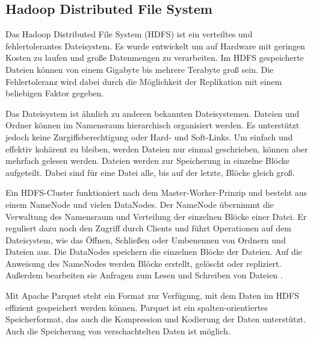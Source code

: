 \subsection{Hadoop Distributed File System}

Das Hadoop Distributed File System (HDFS) ist ein verteiltes und fehlertolerantes Dateisystem.
Es wurde entwickelt um auf Hardware mit geringen Kosten zu laufen und große Datenmengen zu verarbeiten.
Im HDFS gespeicherte Dateien können von einem Gigabyte bis mehrere Terabyte groß sein.
Die Fehlertoleranz wird dabei durch die Möglichkeit der Replikation mit einem beliebigen Faktor gegeben.

Das Dateisystem ist ähnlich zu anderen bekannten Dateisystemen.
Dateien und Ordner können im Namensraum hierarchisch organisiert werden.
Es unterstützt jedoch keine Zurgiffsberechtigung oder Hard- und Soft-Links.
Um einfach und effektiv kohärent zu bleiben, werden Dateien nur einmal geschrieben, können aber mehrfach gelesen werden.
Dateien werden zur Speicherung in einzelne Blöcke aufgeteilt.
Dabei sind für eine Datei alle, bis auf der letzte, Blöcke gleich groß.

Ein HDFS-Cluster funktioniert nach dem Master-Worker-Prinzip und besteht aus einem NameNode und vielen DataNodes.
Der NameNode übernimmt die Verwaltung des Namensraum und Verteilung der einzelnen Blöcke einer Datei.
Er reguliert dazu noch den Zugriff durch Clients und führt Operationen auf dem Dateisystem, wie das Öffnen, Schließen oder Umbenennen von Ordnern und Dateien aus.
Die DataNodes speichern die einzelnen Blöcke der Dateien.
Auf die Anweisung des NameNodes werden Blöcke erstellt, gelöscht oder repliziert.
Außerdem bearbeiten sie Anfragen zum Lesen und Schreiben von Dateien \parencite{hdfs}.

Mit Apache Parquet steht ein Format zur Verfügung, mit dem Daten im HDFS effizient gespeichert werden können.
Parquet ist ein spalten-orientiertes Speicherformat, das auch die Kompression und Kodierung der Daten unterstützt.
Auch die Speicherung von verschachtelten Daten ist möglich.
